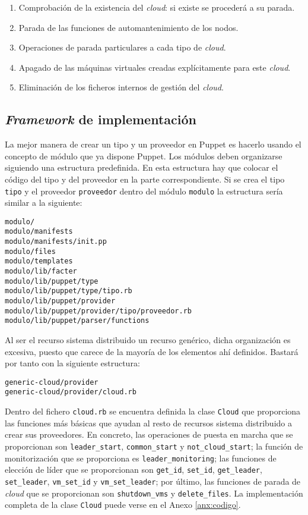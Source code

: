 \begin{enumerate}
\item Comprobación de la existencia del \emph{cloud}: si existe se procederá a su parada.
\item Parada de las funciones de automantenimiento de los nodos.
\item Operaciones de parada particulares a cada tipo de \emph{cloud}.
\item Apagado de las máquinas virtuales creadas explícitamente para este \emph{cloud}.
\item Eliminación de los ficheros internos de gestión del \emph{cloud}.
\end{enumerate}


\subsection{\emph{Framework} de implementación}
\label{sec:modelado-framework}


La mejor manera de crear un tipo y un proveedor en Puppet es hacerlo usando el concepto de módulo que ya dispone Puppet. Los módulos deben organizarse siguiendo una estructura predefinida. En esta estructura hay que colocar el código del tipo y del proveedor en la parte correspondiente. Si se crea el tipo \texttt{tipo} y el proveedor \texttt{proveedor} dentro del módulo \texttt{modulo} la estructura sería similar a la siguiente:

\begin{lstlisting}
modulo/
modulo/manifests
modulo/manifests/init.pp
modulo/files
modulo/templates
modulo/lib/facter
modulo/lib/puppet/type
modulo/lib/puppet/type/tipo.rb
modulo/lib/puppet/provider
modulo/lib/puppet/provider/tipo/proveedor.rb
modulo/lib/puppet/parser/functions
\end{lstlisting}

Al ser el recurso sistema distribuido un recurso genérico, dicha organización es excesiva, puesto que carece de la mayoría de los elementos ahí definidos. Bastará por tanto con la siguiente estructura:

\begin{lstlisting}
generic-cloud/provider
generic-cloud/provider/cloud.rb
\end{lstlisting}

Dentro del fichero \texttt{cloud.rb} se encuentra definida la clase \texttt{Cloud} que proporciona las funciones más básicas que ayudan al resto de recursos sistema distribuido a crear sus proveedores. En concreto, las operaciones de puesta en marcha que se proporcionan son \texttt{leader\_start}, \texttt{common\_start} y \texttt{not\_cloud\_start}; la función de monitorización que se proporciona es \texttt{leader\_monitoring}; las funciones de elección de líder que se proporcionan son \texttt{get\_id}, \texttt{set\_id}, \texttt{get\_leader}, \texttt{set\_leader}, \texttt{vm\_set\_id} y \texttt{vm\_set\_leader}; por último, las funciones de parada de \emph{cloud} que se proporcionan son \texttt{shutdown\_vms} y \texttt{delete\_files}. La implementación completa de la clase \texttt{Cloud} puede verse en el Anexo \ref{anx:codigo}.

